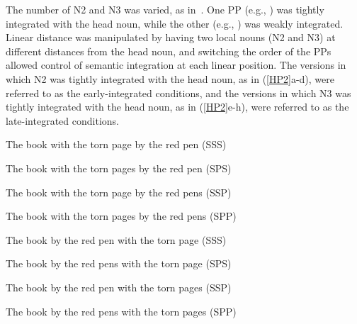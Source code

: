 \documentclass[12pt,titlepage]{article}
\newcommand{\IGNORE}[1]{} %
\begin{document}
The number of N2 and N3 was varied, as in~.  One PP (e.g., ) was tightly integrated with the head noun, while
the other (e.g., ) was weakly
integrated. Linear distance was manipulated by having two local nouns (N2 and N3) at different distances from the head noun, and switching the order of the PPs allowed control of semantic integration at each linear position. The versions in which N2 was tightly integrated with the head noun, as in (\ref{HP2}a-d), were referred to as the early-integrated conditions, and the versions in which N3 was tightly integrated with the head noun, as in  (\ref{HP2}e-h), were referred to as the late-integrated conditions. \IGNORE{The stimuli
equated hierarchical distance between the head noun (and thus also the
verb) and each of the two local nouns by ensuring that both PPs modified
the head.}

\begin{myexample}
\label{HP2}
\begin{examples}

    \item \label{HP2-early-sss} The book with the torn page by the red
    pen \hfill (SSS)\hspace{10em}

    \item \label{HP2-early-sps} The book with the torn pages by the
    red pen \hfill (SPS)\hspace{10em}

    \item \label{HP2-early-ssp} The book with the torn page by the red
    pens \hfill (SSP)\hspace{10em}

    \item \label{HP2-early-spp} The book with the torn pages by the red
    pens \hfill (SPP)\hspace{10em}

    \item \label{HP2-late-sss} The book by the red pen with the torn
    page \hfill (SSS)\hspace{10em}

    \item \label{HP2-late-sps} The book by the red pens with the torn
    page \hfill (SPS)\hspace{10em}

    \item \label{HP2-late-ssp} The book by the red pen with the torn
    pages \hfill (SSP)\hspace{10em}

    \item \label{HP2-late-spp} The book by the red pens with the torn
    pages \hfill (SPP)\hspace{10em}

\end{examples}
\end{myexample}
\end{document}
